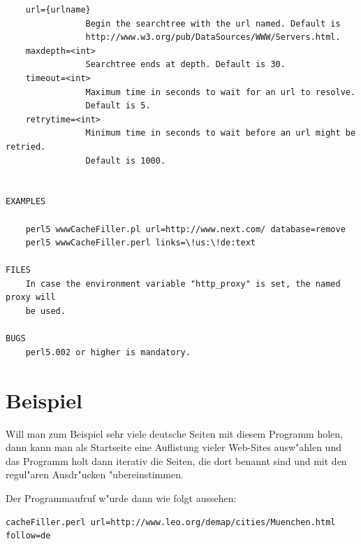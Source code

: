 {\begin{verbatim}
    url={urlname}
                Begin the searchtree with the url named. Default is
                http://www.w3.org/pub/DataSources/WWW/Servers.html.
    maxdepth=<int>          
                Searchtree ends at depth. Default is 30.
    timeout=<int>           
                Maximum time in seconds to wait for an url to resolve. 
                Default is 5.
    retrytime=<int>           
                Minimum time in seconds to wait before an url might be retried. 
                Default is 1000.


EXAMPLES
    
    perl5 wwwCacheFiller.pl url=http://www.next.com/ database=remove
    perl5 wwwCacheFiller.perl links=\!us:\!de:text

FILES
    In case the environment variable "http_proxy" is set, the named proxy will
    be used.
	
BUGS
    perl5.002 or higher is mandatory.

\end{verbatim}
}

\section{Beispiel}

Will man zum Beispiel sehr viele deutsche Seiten mit diesem Programm holen, dann kann man als Startseite eine Auflistung vieler Web-Sites ausw"ahlen und das Programm holt dann iterativ die Seiten, die dort benannt sind und mit den regul"aren Ausdr"ucken "ubereinstimmen.

Der Programmaufruf w"urde dann wie folgt aussehen:
{\small
\begin{verbatim}
cacheFiller.perl url=http://www.leo.org/demap/cities/Muenchen.html follow=de
\end{verbatim}
}

